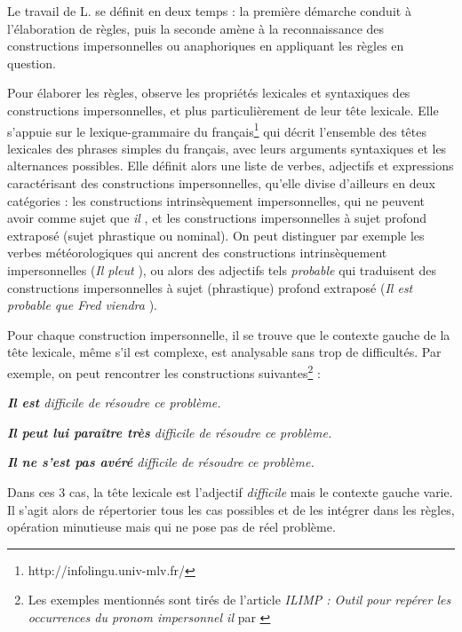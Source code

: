 \documentclass[a4paper,12pt]{article}
\begin{document}
Le travail de L. \citeauthor{danlos-ilimp-taln2005} se définit en deux temps : la première démarche conduit à l'élaboration de règles, puis la seconde amène à la reconnaissance des constructions impersonnelles ou anaphoriques en appliquant les règles en question.

Pour élaborer les règles, \citeauthor{danlos-ilimp-taln2005} observe les propriétés lexicales et syntaxiques des constructions impersonnelles, et plus particulièrement de leur tête lexicale. Elle s'appuie sur le lexique-grammaire du français\footnote{http://infolingu.univ-mlv.fr/} \citep{gross-halshs-00278309,leclere-hal-00192888}
 qui décrit l'ensemble des têtes lexicales des phrases simples du français, avec leurs arguments syntaxiques et les alternances possibles.
Elle définit alors une liste de verbes, adjectifs et expressions caractérisant des constructions impersonnelles, qu'elle divise d'ailleurs en deux catégories : les constructions intrinsèquement impersonnelles, qui ne peuvent avoir comme sujet que \og \textit{il} \fg{}, et les constructions impersonnelles à sujet profond extraposé (sujet phrastique ou nominal). On peut distinguer par exemple les verbes météorologiques qui ancrent des constructions intrinsèquement impersonnelles (\og \textit{Il pleut} \fg{}), ou alors des adjectifs tels \og \textit{probable} \fg{} qui traduisent des constructions impersonnelles à sujet (phrastique) profond extraposé (\og \textit{Il est probable que Fred viendra} \fg{}).

Pour chaque construction impersonnelle, il se trouve que le contexte gauche de la tête lexicale, même s'il est complexe, est analysable sans trop de difficultés.
Par exemple, on peut rencontrer les constructions suivantes\footnote{Les exemples mentionnés sont tirés de l'article \textit{ILIMP : Outil pour repérer les occurrences du pronom impersonnel il} par \citet{danlos-ilimp-taln2005}} :

\og{}\textit{\textbf{Il est} difficile de résoudre ce problème.}\fg{}

\og{}\textit{\textbf{Il peut lui paraître très} difficile de résoudre ce problème.}\fg{}

\og{}\textit{\textbf{Il ne s'est pas avéré} difficile de résoudre ce problème.}\fg{}

Dans ces 3 cas, la tête lexicale est l'adjectif \og \textit{difficile} \fg{} mais le contexte gauche varie. Il s'agit alors de répertorier tous les cas possibles et de les intégrer dans les règles, opération minutieuse mais qui ne pose pas de réel problème.
\end{document}
